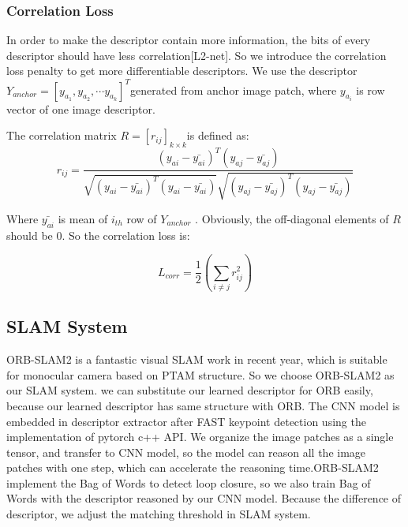 \documentclass[letterpaper, 10 pt, conference]{ieeeconf}  %
\begin{document}
\subsubsection{Correlation Loss} 
In order to make the descriptor contain more information, the bits of every descriptor should have less correlation[L2-net]. So we introduce the correlation loss penalty to get more differentiable descriptors. We use the descriptor       $ Y_{anchor} = \left [ y_{a_1}, y_{a_2},\cdots y_{a_k}\right ]^{T} $generated from anchor image patch, where  $y_{a_i}$ is row vector of one image descriptor.

The correlation matrix $ R=[r_{ij}]_{k \times k} $is defined as:
\begin{equation}
r_{ij} = \frac{(y_{ai}-\bar{y_{ai}})^{T}(y_{aj}-\bar{y_{aj}})}{\sqrt{(y_{ai}-\bar{y_{ai}})^{T}(y_{ai}-\bar{y_{ai}})}\sqrt{(y_{aj}-\bar{y_{aj}})^{T}(y_{aj}-\bar{y_{aj}})}} 
\end{equation}

Where $ \bar{y_{ai}}$  is mean of $i_{th}$ row of $Y_{anchor}$ . Obviously, the off-diagonal elements of $R$ should be 0. So the correlation loss is:

\begin{equation}
L_{corr}=\frac{1}{2} \left(\sum\limits_{i \neq j} r_{ij}^2 \right)
\end{equation}

\subsection{SLAM System} 

ORB-SLAM2 is a fantastic visual SLAM work in recent year, which is suitable for monocular camera based on PTAM structure. So we choose ORB-SLAM2 as our SLAM system. we can substitute our learned descriptor for ORB easily, because our learned descriptor has same structure with ORB. The CNN model is embedded in descriptor extractor after FAST keypoint detection using the implementation of pytorch c++ API. We organize the image patches as a single tensor, and transfer to CNN model, so the model can reason all the image patches with one step, which can accelerate the reasoning time.ORB-SLAM2 implement the Bag of Words to detect loop closure, so we also train Bag of Words with the descriptor reasoned by our CNN model. Because the difference of descriptor, we adjust the matching threshold in SLAM system.

\end{document}
